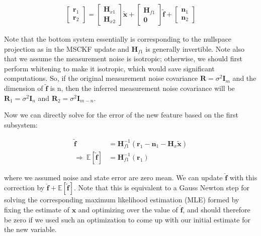 \begin{align*} \begin{bmatrix} \mathbf{r}_1 \\ \mathbf{r}_2 \end{bmatrix} = \begin{bmatrix} \mathbf{H}_{x1} \\ \mathbf{H}_{x2} \end{bmatrix} \tilde{\mathbf{x}} +\begin{bmatrix} \mathbf{H}_{f1} \\ \mathbf{0} \end{bmatrix} \tilde{\mathbf{f}} + \begin{bmatrix} \mathbf{n}_1 \\ \mathbf{n}_2 \end{bmatrix} \end{align*}

Note that the bottom system essentially is corresponding to the nullspace projection as in the M\+S\+C\+KF update and $\mathbf{H}_{f1}$ is generally invertible. Note also that we assume the measurement noise is isotropic; otherwise, we should first perform whitening to make it isotropic, which would save significant computations. So, if the original measurement noise covariance $\mathbf{R} = \sigma^2\mathbf{I}_m$ and the dimension of $\tilde{\mathbf{f}}$ is n, then the inferred measurement noise covariance will be $\mathbf{R}_1 = \sigma^2\mathbf{I}_n$ and $\mathbf{R}_2 = \sigma^2\mathbf{I}_{m-n}$.

Now we can directly solve for the error of the new feature based on the first subsystem\+:

\begin{align*} \tilde{\mathbf{f}} &= \mathbf{H}_{f1}^{-1}(\mathbf{r}_1-\mathbf{n}_1-\mathbf{H}_x\tilde{\mathbf{x}}) \\ \Rightarrow~ \mathbb{E}[\tilde{\mathbf{f}}] &= \mathbf{H}_{f1}^{-1}(\mathbf{r}_1) \end{align*}

where we assumed noise and state error are zero mean. We can update $\hat{\mathbf f}$ with this correction by $\hat{\mathbf f}+\mathbb{E}[\tilde{\mathbf{f}}]$. Note that this is equivalent to a Gauss Newton step for solving the corresponding maximum likelihood estimation (M\+LE) formed by fixing the estimate of $\mathbf{x}$ and optimizing over the value of $\hat{\mathbf{f}}$, and should therefore be zero if we used such an optimization to come up with our initial estimate for the new variable.

